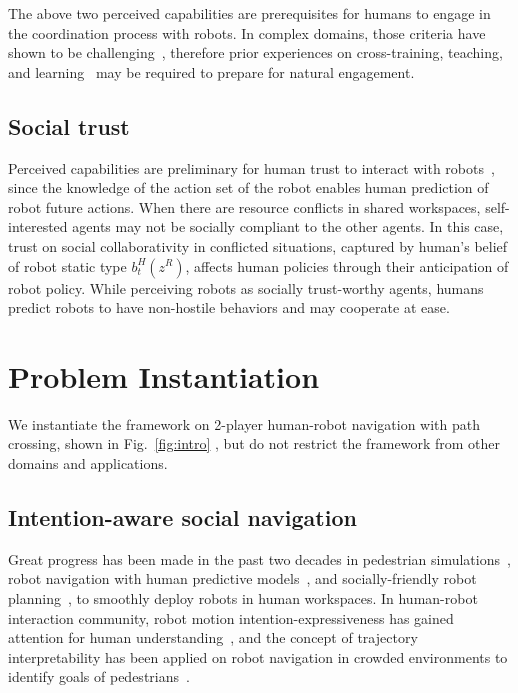 \documentclass[letterpaper, 10 pt, conference]{ieeeconf}  %
\begin{document}
The above two perceived capabilities are prerequisites for humans to engage in the 
coordination process with robots. In complex domains, those criteria have shown to be 
challenging~\cite{knepper2017implicit}, therefore prior experiences on 
cross-training, teaching, and learning~\cite{zhang2017plan} may be required 
to prepare for natural engagement. 
\vspace{-.2em}
\subsection{Social trust}%
\vspace{-.2em}
Perceived capabilities are preliminary for human trust to interact with 
robots~\cite{yang2017evaluating}, since the knowledge of the action set of the robot enables 
human prediction of robot future actions.
When there are resource conflicts in shared workspaces, 
self-interested agents may not be socially compliant to the other agents. 
In this case, trust on social collaborativity in conflicted situations, 
captured by human's belief of robot static type $b^H_t(z^R)$, 
affects human policies through their anticipation of robot policy. While 
perceiving robots as socially 
trust-worthy agents, humans predict robots to have non-hostile behaviors and 
may cooperate at ease.   

\section{Problem Instantiation}
We instantiate the framework on 2-player human-robot navigation with path 
crossing, shown in Fig.~\ref{fig:intro} , but do not restrict the framework from other domains 
and applications.

\vspace{-.2em}
\subsection{Intention-aware social navigation}
\vspace{-.2em}
Great progress has been made in the past two decades in pedestrian simulations~\cite{karamouzas2009predictive,zanlungo2011social}, robot navigation with human predictive models~\cite{trautman2010unfreezing,kuderer2012feature}, and 
socially-friendly robot 
planning~\cite{mavrogiannis2016decentralized,chen2017socially}, to smoothly 
deploy robots in human workspaces. In human-robot interaction community, 
robot motion intention-expressiveness has gained attention for human 
understanding~\cite{dragan2013legibility}, and the concept of trajectory 
interpretability has been applied on robot navigation in crowded 
environments to identify goals of pedestrians~\cite{bai2015intention,unhelkar2015human}. 
\end{document}
